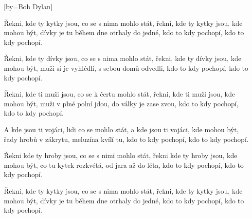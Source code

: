[by={Bob Dylan}]

\beginverse{}
Řekni, kde ty kytky jsou, co se s nima mohlo stát,
řekni, kde ty kytky jsou, kde mohou být,
dívky je tu během dne otrhaly do jedné,
kdo to kdy pochopí, kdo to kdy pochopí.
\endverse{}

\beginverse{}
Řekni, kde ty dívky jsou, co se s nima mohlo stát,
řekni, kde ty dívky jsou, kde mohou být,
muži si je vyhlédli, s sebou domů odvedli,
kdo to kdy pochopí, kdo to kdy pochopí.
\endverse{}

\beginverse{}
Řekni, kde ti muži jsou, co se k čertu mohlo stát,
řekni, kde ti muži jsou, kde mohou být,
muži v plné polní jdou, do války je zase zvou,
kdo to kdy pochopí, kdo to kdy pochopí.
\endverse{}

\beginverse{}
A kde jsou ti vojáci, lidi co se mohlo stát,
a kde jsou ti vojáci, kde mohou být,
řady hrobů v zákrytu, meluzína kvílí tu,
kdo to kdy pochopí, kdo to kdy pochopí.
\endverse{}

\beginverse{}
Řekni kde ty hroby jsou, co se s nimi mohlo stát,
řekni kde ty hroby jsou, kde mohou být,
co tu kytek rozkvétá, od jara až do léta,
kdo to kdy pochopí, kdo to kdy pochopí.
\endverse{}

\beginverse{}
Řekni, kde ty kytky jsou, co se s nima mohlo stát,
řekni, kde ty kytky jsou, kde mohou být,
dívky je tu během dne otrhaly do jedné,
kdo to kdy pochopí, kdo to kdy pochopí.
\endverse{}

\endsong{}
